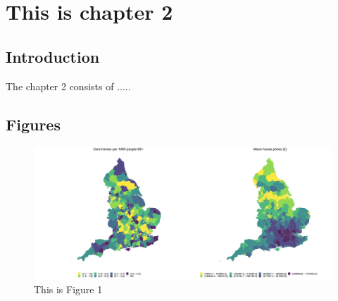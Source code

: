 \singlespacing
\chapter{This is chapter 2}
\label{ch2}
\doublespacing
{}

\section{Introduction}
\label{sec: intro}

The chapter 2 consists of .....

\newpage

\begin{landscape}
\section{Figures}
\label{sec: figures}

\begin{figure}[!h]
\centering
  \caption{This is Figure 1}
    \label{fig: maps1}
    
\includegraphics[width=1\textwidth]{ch_2/maps_test.png}


\end{figure}

\end{landscape}

\newpage 

